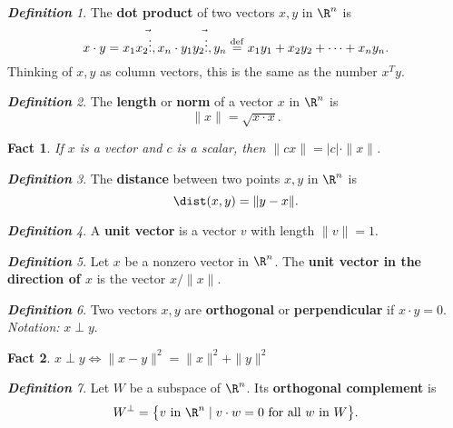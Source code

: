 \documentclass[12pt]{amsart}
\theoremstyle{plain}
\newtheorem*{fact}{Fact}
\theoremstyle{remark}
\newtheorem*{Defn}{\bf Definition}
\begin{document}
\begin{Defn}
\item The \textbf{dot product} of two vectors $x,y$ in $\R^n$ is
  \[ x\cdot y = \vec{x_1 x_2 \vdots, x_n} \cdot \vec{y_1 y_2 \vdots, y_n}
  \overset{\rm def}= x_1y_1 + x_2y_2 + \cdots + x_ny_n. \]
  Thinking of $x,y$ as column vectors, this is the same as the number $x^Ty$.
\end{Defn}

\begin{Defn}
  The \textbf{length} or \textbf{norm} of a vector $x$ in $\R^n$ is
  \[\|x\| = \sqrt{x\cdot x}.\]
\end{Defn}

\begin{fact}
  If $x$ is a vector and $c$ is a scalar, then
  $\|cx\| = |c|\cdot\|x\|$.
\end{fact}

\begin{Defn}
  The \textbf{distance} between two points $x,y$ in $\R^n$ is
  \[ \dist(x,y) = \|y-x\|. \]
\end{Defn}

\begin{Defn}
  A \textbf{unit vector} is a vector $v$ with length $\|v\|=1$.
\end{Defn}

\begin{Defn}
  Let $x$ be a nonzero vector in $\R^n$.  The
  \textbf{unit vector in the direction of $x$} is the vector $x/\|x\|$.
\end{Defn}

\begin{Defn}
  Two vectors $x,y$ are \textbf{\color{red}orthogonal} or
  \textbf{\color{red}perpendicular} if
  $x\cdot y = 0$.  \\
  \emph{Notation:} $x\perp y$.
\end{Defn}

\begin{fact}
  $x\perp y \iff \|x-y\|^2=\|x\|^2+\|y\|^2$
\end{fact}

\begin{Defn}
  Let $W$ be a subspace of $\R^n$.  Its \textbf{orthogonal complement} is
  \[ W^\perp = \bigl\{ \text{$v$ in $\R^n$}\mid v\cdot w=0
  \text{ for all $w$ in $W$} \bigr\}. \]
\end{Defn}
\end{document}
